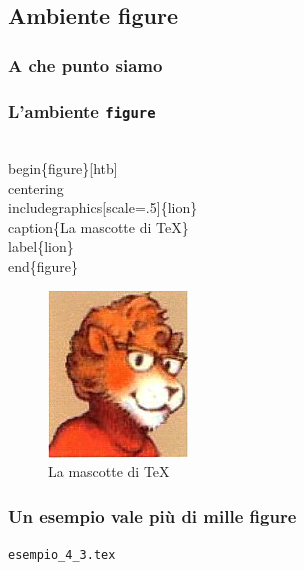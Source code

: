 \documentclass[svgnames,%
	ucs,%
	pdftex]{guitbeamer}
\begin{document}
\subsection{Ambiente figure}
\begin{frame}
  \frametitle{A che punto siamo}
\end{frame}
\begin{frame}
  \frametitle{L'ambiente \texttt{figure}}
	\begin{LaTeXcode}
		\alert{\\begin\{figure\}[htb]}\n
		\hspace*{5ex}\\centering\n
		\hspace*{5ex}\\includegraphics[scale=.5]\{lion\}\n
		\hspace*{5ex}\\caption\{La mascotte di \TeX\}\\label\{lion\}\n
		\alert{\\end\{figure\}}
	\end{LaTeXcode}
	\begin{figure}[h]
	  \centering
		\includegraphics[scale=.5]{lion}
		\caption{La mascotte di \TeX}\label{lion}
	\end{figure}
\end{frame}
\begin{frame}
  \frametitle{Un esempio vale pi\`u di mille figure}
	\begin{center}
		\alert{\texttt{esempio\_4\_3.tex}}
	\end{center}
\end{frame}
\end{document}
